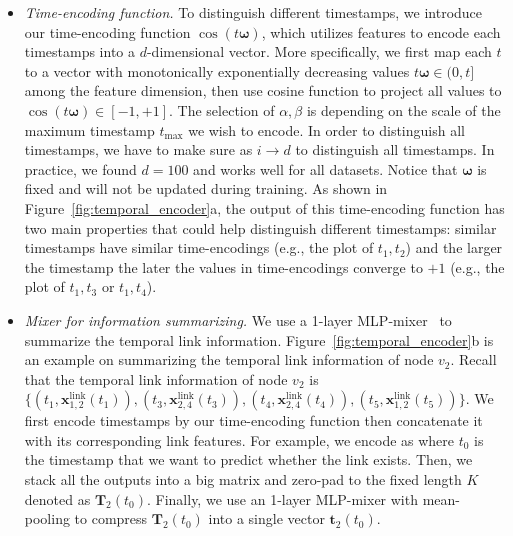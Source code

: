 \begin{itemize} [noitemsep,topsep=0pt,leftmargin=5mm ]
    \item \textit{Time-encoding function.} To distinguish different timestamps, we introduce our time-encoding function $\cos(t\boldsymbol{\omega})$, which utilizes features  to encode each timestamps into a $d$-dimensional vector. 
    More specifically, we first map each $t$ to a vector with monotonically exponentially decreasing values $t\boldsymbol{\omega} \in (0, t]$ among the feature dimension, then use cosine function to project all values to $\cos(t\boldsymbol{\omega}) \in [-1,+1]$.
    The selection of $\alpha,\beta$ is depending on the scale of the maximum timestamp $t_{\max}$ we wish to encode. In order to distinguish all timestamps, we have to make sure  as $i\rightarrow d$ to distinguish all timestamps.
    In practice, we found $d=100$ and  works well for all datasets. 
    Notice that $\boldsymbol{\omega}$ is fixed and will not be updated during training.
    As shown in Figure~\ref{fig:temporal_encoder}a,
    the output of this time-encoding function has two main properties that could help \our distinguish different timestamps: similar timestamps have similar time-encodings (e.g., the plot of $t_1,t_2$) and the larger the timestamp the later the values in time-encodings converge to $+1$ (e.g., the plot of $t_1,t_3$ or $t_1, t_4$).
    \item \textit{Mixer for information summarizing.} We use a 1-layer MLP-mixer~\cite{tolstikhin2021mlp} to summarize the temporal link information. Figure~\ref{fig:temporal_encoder}b is an example on summarizing the temporal link information of node $v_2$. Recall that the temporal link information of node $v_2$  is $\{ (t_1, \mathbf{x}_{1,2}^\text{link}(t_1)), (t_3, \mathbf{x}_{2,4}^\text{link}(t_3)), (t_4, \mathbf{x}_{2,4}^\text{link}(t_4)), (t_5, \mathbf{x}_{1,2}^\text{link}(t_5)) \}$. We first encode timestamps by our time-encoding function then concatenate it with its corresponding link features. For example, we encode  as  where $t_0$ is the timestamp that we want to predict whether the link exists. Then, we stack all the outputs into a big matrix and zero-pad to the fixed length $K$ denoted as $\mathbf{T}_2(t_0)$.
    Finally, we use an 1-layer MLP-mixer with mean-pooling to compress $\mathbf{T}_2(t_0)$ into a single vector $\mathbf{t}_2(t_0)$.

\end{itemize}

